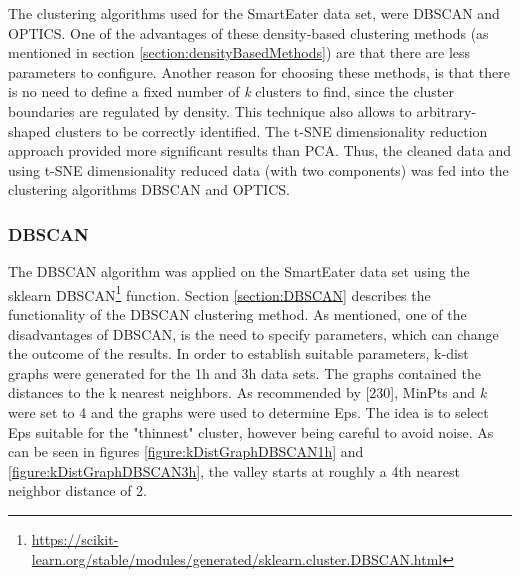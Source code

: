 The clustering algorithms used for the SmartEater data set, were DBSCAN and OPTICS. One of the advantages of these density-based clustering methods (as mentioned in section \ref{section:densityBasedMethods}) are that there are less parameters to configure. Another reason for choosing these methods, is that there is no need to define a fixed number of \textit{k} clusters to find, since the cluster boundaries are regulated by density. This technique also allows to arbitrary-shaped clusters to be correctly identified. The t-SNE dimensionality reduction approach provided more significant results than PCA. Thus, the cleaned data and using t-SNE dimensionality reduced data (with two components) was fed into the clustering algorithms DBSCAN and OPTICS.

\subsubsection{DBSCAN}
The DBSCAN algorithm was applied on the SmartEater data set using the sklearn DBSCAN\footnote{\url{https://scikit-learn.org/stable/modules/generated/sklearn.cluster.DBSCAN.html}} function.
Section \ref{section:DBSCAN} describes the functionality of the DBSCAN clustering method. As mentioned, one of the disadvantages of DBSCAN, is the need to specify parameters, which can change the outcome of the results. In order to establish suitable parameters, k-dist graphs were generated for the 1h and 3h data sets. The graphs contained the distances to the k nearest neighbors. As recommended by \textcite{DBSCAN}[230], MinPts and \textit{k} were set to 4 and the graphs were used to determine Eps. The idea is to select Eps suitable for the "thinnest" cluster, however being careful to avoid noise. As can be seen in figures \ref{figure:kDistGraphDBSCAN1h} and \ref{figure:kDistGraphDBSCAN3h}, the valley starts at roughly a 4th nearest neighbor distance of 2. 




